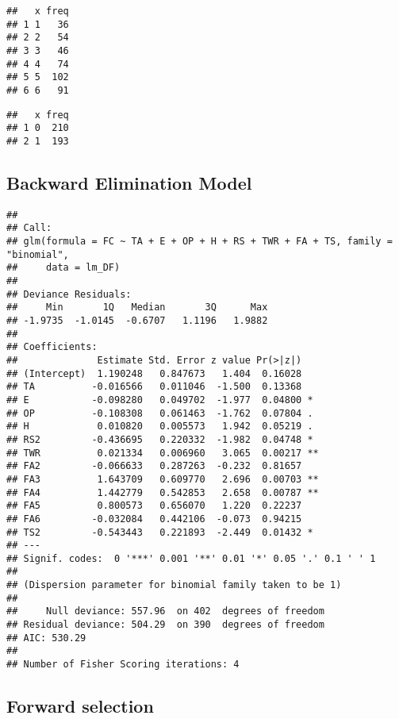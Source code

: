 \documentclass[]{article}
\begin{document}
\begin{verbatim}
##   x freq
## 1 1   36
## 2 2   54
## 3 3   46
## 4 4   74
## 5 5  102
## 6 6   91
\end{verbatim}

\begin{verbatim}
##   x freq
## 1 0  210
## 2 1  193
\end{verbatim}

\hypertarget{backward-elimination-model-3}{%
\subsection{Backward Elimination
Model}\label{backward-elimination-model-3}}

\begin{verbatim}
## 
## Call:
## glm(formula = FC ~ TA + E + OP + H + RS + TWR + FA + TS, family = "binomial", 
##     data = lm_DF)
## 
## Deviance Residuals: 
##     Min       1Q   Median       3Q      Max  
## -1.9735  -1.0145  -0.6707   1.1196   1.9882  
## 
## Coefficients:
##              Estimate Std. Error z value Pr(>|z|)   
## (Intercept)  1.190248   0.847673   1.404  0.16028   
## TA          -0.016566   0.011046  -1.500  0.13368   
## E           -0.098280   0.049702  -1.977  0.04800 * 
## OP          -0.108308   0.061463  -1.762  0.07804 . 
## H            0.010820   0.005573   1.942  0.05219 . 
## RS2         -0.436695   0.220332  -1.982  0.04748 * 
## TWR          0.021334   0.006960   3.065  0.00217 **
## FA2         -0.066633   0.287263  -0.232  0.81657   
## FA3          1.643709   0.609770   2.696  0.00703 **
## FA4          1.442779   0.542853   2.658  0.00787 **
## FA5          0.800573   0.656070   1.220  0.22237   
## FA6         -0.032084   0.442106  -0.073  0.94215   
## TS2         -0.543443   0.221893  -2.449  0.01432 * 
## ---
## Signif. codes:  0 '***' 0.001 '**' 0.01 '*' 0.05 '.' 0.1 ' ' 1
## 
## (Dispersion parameter for binomial family taken to be 1)
## 
##     Null deviance: 557.96  on 402  degrees of freedom
## Residual deviance: 504.29  on 390  degrees of freedom
## AIC: 530.29
## 
## Number of Fisher Scoring iterations: 4
\end{verbatim}

\hypertarget{forward-selection-1}{%
\subsection{Forward selection}\label{forward-selection-1}}
\end{document}
